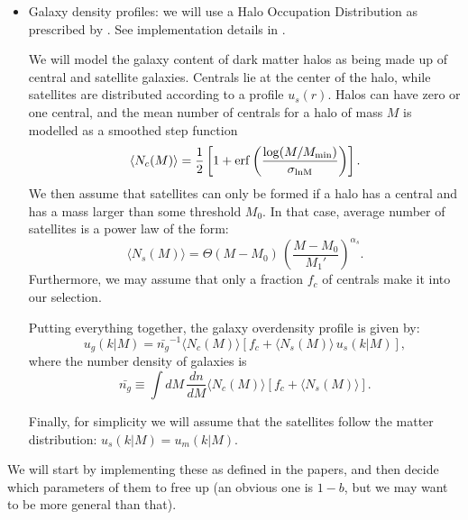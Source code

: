 \documentclass{article}
\begin{document}
\begin{itemize}
\item Galaxy density profiles: we will use a Halo Occupation Distribution as prescribed by \cite{2005ApJ...633..791Z,2011ApJ...736...59Z}. See implementation details in \cite{2017MNRAS.470.2100K}.

  We will model the galaxy content of dark matter halos as being made up of central and satellite galaxies. Centrals lie at the center of the halo, while satellites are distributed according to a profile $u_s(r)$. Halos can have zero or one central, and the mean number of centrals for a halo of mass $M$ is modelled as a smoothed step function
  \begin{equation}
    \langle N_c(M)\rangle=\frac{1}{2}\left[1+{\rm erf}\left(\frac{\log(M/M_{\rm min})}{\sigma_{\rm lnM}}\right)\right].
  \end{equation}
  We then assume that satellites can only be formed if a halo has a central and has a mass larger than some threshold $M_0$. In that case, average number of satellites is a power law of the form:
  \begin{equation}
    \langle N_s(M)\rangle=\Theta(M-M_0)\,\left(\frac{M-M_0}{M_1'}\right)^{\alpha_s}.
  \end{equation}
  Furthermore, we may assume that only a fraction $f_c$ of centrals make it into our selection.

  Putting everything together, the galaxy overdensity profile is given by:
  \begin{equation}
    u_g(k|M)=\bar{n_g}^{-1}\langle N_c(M)\rangle\left[f_c+\langle N_s(M)\rangle\,u_s(k|M)\right],
  \end{equation}
  where the number density of galaxies is
  \begin{equation}
    \bar{n_g}\equiv\int dM\,\frac{dn}{dM}\langle N_c(M)\rangle\left[f_c+\langle N_s(M)\rangle\right].
  \end{equation}

  Finally, for simplicity we will assume that the satellites follow the matter distribution: $u_s(k|M)=u_m(k|M)$.

\end{itemize}
We will start by implementing these as defined in the papers, and then decide which parameters of them to free up (an obvious one is $1-b$, but we may want to be more general than that).
\end{document}
